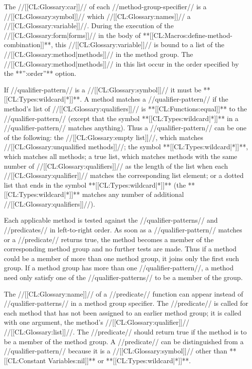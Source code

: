 The //[[CL:Glossary:car]]// of each //method-group-specifier// is a //[[CL:Glossary:symbol]]// which //[[CL:Glossary:names]]// a //[[CL:Glossary:variable]]//. During the execution of the //[[CL:Glossary:form|forms]]// in the body of **[[CL:Macros:define-method-combination]]**, this //[[CL:Glossary:variable]]// is bound to a list of the //[[CL:Glossary:method|methods]]// in the method group. The //[[CL:Glossary:method|methods]]// in this list occur in the order specified by the **'':order''** option.

If //qualifier-pattern// is a //[[CL:Glossary:symbol]]// it must be **[[CL:Types:wildcard|*]]**. A method matches a //qualifier-pattern// if the method's list of //[[CL:Glossary:qualifiers]]// is **[[CL:Functions:equal]]** to the //qualifier-pattern// (except that the symbol **[[CL:Types:wildcard|*]]** in a //qualifier-pattern// matches anything). Thus a //qualifier-pattern// can be one of the following: the //[[CL:Glossary:empty list]]//, which matches //[[CL:Glossary:unqualified methods]]//; the symbol **[[CL:Types:wildcard|*]]**, which matches all methods; a true list, which matches methods with the same number of //[[CL:Glossary:qualifiers]]// as the length of the list when each //[[CL:Glossary:qualifier]]// matches the corresponding list element; or a dotted list that ends in the symbol **[[CL:Types:wildcard|*]]** (the **[[CL:Types:wildcard|*]]** matches any number of additional //[[CL:Glossary:qualifiers]]//).

Each applicable method is tested against the //qualifier-patterns// and //predicates// in left-to-right order. As soon as a //qualifier-pattern// matches or a //predicate// returns true, the method becomes a member of the corresponding method group and no further tests are made. Thus if a method could be a member of more than one method group, it joins only the first such group. If a method group has more than one //qualifier-pattern//, a method need only satisfy one of the //qualifier-patterns// to be a member of the group.

The //[[CL:Glossary:name]]// of a //predicate// function can appear instead of //qualifier-patterns// in a method group specifier. The //predicate// is called for each method that has not been assigned to an earlier method group; it is called with one argument, the method's //[[CL:Glossary:qualifier]]// //[[CL:Glossary:list]]//. The //predicate// should return true if the method is to be a member of the method group. A //predicate// can be distinguished from a //qualifier-pattern// because it is a //[[CL:Glossary:symbol]]// other than **[[CL:Constant Variables:nil]]** or **[[CL:Types:wildcard|*]]**.

